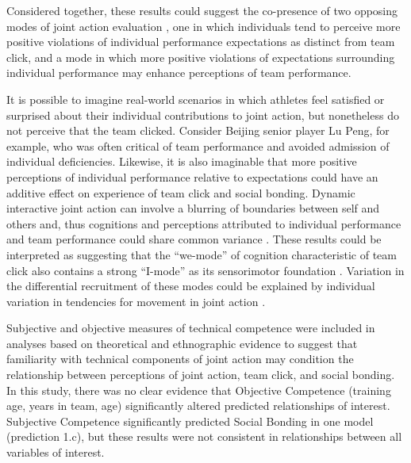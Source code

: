 \begin{CJK}{UTF8}{gbsn}
Considered together, these results could suggest the co-presence of two opposing modes of joint action evaluation \citep{Friston2015a}, one in which individuals tend to perceive more positive violations of individual performance expectations as distinct from team click, and a mode in which more positive violations of expectations surrounding individual performance may enhance perceptions of team performance.

It is possible to imagine real-world scenarios in which athletes feel satisfied or surprised about their individual contributions to joint action, but nonetheless do not perceive that the team clicked.  Consider Beijing senior player Lu Peng, for example, who was often critical of team performance and avoided admission of individual deficiencies.  Likewise, it is also imaginable that more positive perceptions of individual performance relative to expectations could have an additive effect on experience of team click and social bonding.  Dynamic interactive joint action can involve a blurring of boundaries between self and others and, thus cognitions and perceptions attributed to individual performance and team performance could share common variance \citep{Friston2015}.  These results could be interpreted as suggesting that the ``we-mode'' of cognition characteristic of team click also contains a strong ``I-mode'' as its sensorimotor foundation \citep{Gallotti2013,VanderWel2015}.  Variation in the differential recruitment of these modes could be explained by individual variation in tendencies for movement in joint action \citep{Keller2014}.




Subjective and objective measures of technical competence were included in analyses based on theoretical and ethnographic evidence to suggest that familiarity with technical components of joint action may condition the relationship between perceptions of joint action, team click, and social bonding.  In this study, there was no clear evidence that Objective Competence (training age, years in team, age) significantly altered predicted relationships of interest.  Subjective Competence significantly predicted Social Bonding in one model (prediction 1.c), but these results were not consistent in relationships between all variables of interest.


\end{CJK}
